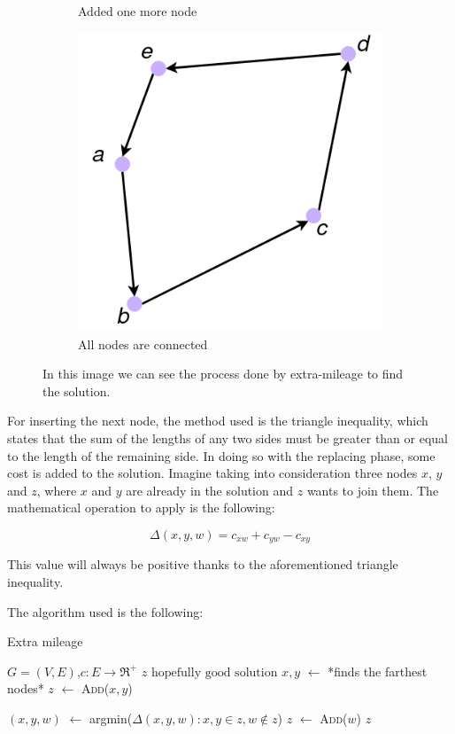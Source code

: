 \begin{figure}
\begin{subfigure}{0.3\textwidth}
		\caption{Added one more node}
	\end{subfigure}
	\hfill
	\begin{subfigure}{0.3\textwidth}
		\centering
		\includegraphics[width=\textwidth]{images/extra_5}
		\caption{All nodes are connected}
	\end{subfigure}
	\caption{In this image we can see the process done by extra-mileage to find the solution.}
	\label{fig:extra}
\end{figure}

For inserting the next node, the method used is the triangle inequality, which states that the sum of the lengths of any two sides must be greater than or equal to the length of the remaining side. In doing so with the replacing phase, some cost is added to the solution. Imagine taking into consideration three nodes $x$, $y$ and $z$, where $x$ and $y$ are already in the solution and $z$ wants to join them. The mathematical operation to apply is the following:

\begin{equation}
	\Delta(x, y, w) = c_{xw} + c_{yw} - c_{xy}
\end{equation}

This value will always be positive thanks to the aforementioned triangle inequality.

The algorithm used is the following:
\begin{algorithm}
	\caption{Extra mileage}\label{algo:extra-mileage}
	\begin{algorithmic}[1]
		\Require $G=(V,E)$,$ c:E\rightarrow \Re^+$
		\Ensure $z\text{ hopefully good solution}$
		\State $x, y$ $\gets$ *finds the farthest nodes*
		\State $z$ $\gets$ \textsc{Add($x, y$)}
		
			\State $(x, y, w)$ $\gets$ argmin($\Delta(x, y, w):x, y \in z, w \not \in z$)
			\State $z$ $\gets$ \textsc{Add($w $)}
		\EndWhile
		\State \Return $z$
	\end{algorithmic}
\end{algorithm}

